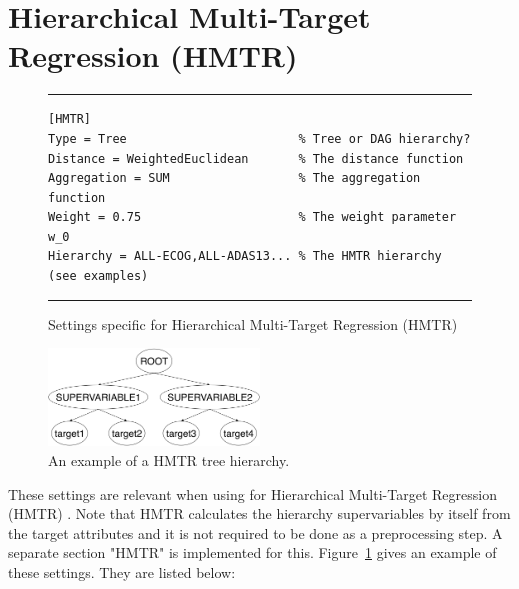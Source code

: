 \section{Hierarchical Multi-Target Regression (HMTR)}


\begin{figure}[tb]
\hrule\vspace{1em}
\begin{verbatim}
[HMTR]
Type = Tree                        % Tree or DAG hierarchy?
Distance = WeightedEuclidean       % The distance function
Aggregation = SUM                  % The aggregation function
Weight = 0.75                      % The weight parameter w_0
Hierarchy = ALL-ECOG,ALL-ADAS13... % The HMTR hierarchy (see examples)
\end{verbatim}
\hrule
\caption{Settings specific for Hierarchical Multi-Target Regression (HMTR)}
\label{settings-hmtr:fig}
\end{figure}

\begin{figure}[tb]
\centering
\includegraphics[width=0.5\textwidth]{fig/hmtr}
\caption{An example of a HMTR tree hierarchy.}
\label{settings-hmtrex:fig}
\end{figure}

These settings are relevant when using \clus{} for Hierarchical Multi-Target Regression (HMTR) \cite{Mileski2017:proc}. Note that HMTR calculates the hierarchy supervariables by itself from the target attributes and it is not required to be done as a preprocessing step. A separate section "HMTR" is implemented for this. Figure~\ref{settings-hmtr:fig} gives an example of these settings. They are listed below:


